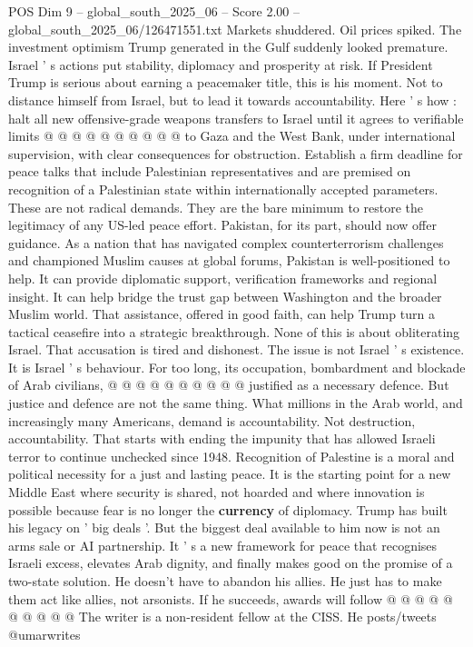 \begin{textsample}{POS Dim 9 – global\_south\_2025\_06 – Score 2.00 – global\_south\_2025\_06/126471551.txt}
Markets shuddered.
Oil prices spiked.
The investment optimism Trump generated in the Gulf suddenly looked premature.
Israel ' s actions put stability, diplomacy and prosperity at risk.
If President Trump is serious about earning a peacemaker title, this is his moment.
Not to distance himself from Israel, but to lead it towards accountability.
Here ' s how : halt all new offensive-grade weapons transfers to Israel until it agrees to verifiable limits @ @ @ @ @ @ @ @ @ @ to Gaza and the West Bank, under international supervision, with clear consequences for obstruction.
Establish a firm deadline for peace talks that include Palestinian representatives and are premised on recognition of a Palestinian state within internationally accepted parameters.
These are not radical demands.
They are the bare minimum to restore the legitimacy of any US-led peace effort.
Pakistan, for its part, should now offer guidance.
As a nation that has navigated complex counterterrorism challenges and championed Muslim causes at global forums, Pakistan is well-positioned to help.
It can provide diplomatic support, verification frameworks and regional insight.
It can help bridge the trust gap between Washington and the broader Muslim world.
That assistance, offered in good faith, can help Trump turn a tactical ceasefire into a strategic breakthrough.
None of this is about obliterating Israel.
That accusation is tired and dishonest.
The issue is not Israel ' s existence.
It is Israel ' s behaviour.
For too long, its occupation, bombardment and blockade of Arab civilians, @ @ @ @ @ @ @ @ @ @ justified as a necessary defence.
But justice and defence are not the same thing.
What millions in the Arab world, and increasingly many Americans, demand is accountability.
Not destruction, accountability.
That starts with ending the impunity that has allowed Israeli terror to continue unchecked since 1948.
Recognition of Palestine is a moral and political necessity for a just and lasting peace.
It is the starting point for a new Middle East where security is shared, not hoarded and where innovation is possible because fear is no longer the \textbf{currency} of diplomacy.
Trump has built his legacy on ' big deals '.
But the biggest deal available to him now is not an arms sale or AI partnership.
It ' s a new framework for peace that recognises Israeli excess, elevates Arab dignity, and finally makes good on the promise of a two-state solution.
He doesn't have to abandon his allies.
He just has to make them act like allies, not arsonists.
If he succeeds, awards will follow @ @ @ @ @ @ @ @ @ @ The writer is a non-resident fellow at the CISS.
He posts/tweets @umarwrites

\end{textsample}
